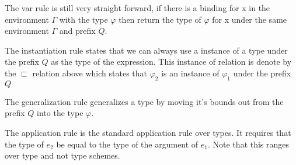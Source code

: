 \begin{prooftree}
\end{prooftree}

The var rule is still very straight forward, if there is a binding for x in the environment $\Gamma$ with the type $\varphi$ then return the type of $\varphi$ for x under the same environment $\Gamma$ and prefix $Q$.

\begin{prooftree}
\end{prooftree}

The instantiation rule states that we can always use a instance of a type under the prefix $Q$ as the type of the expression. This instance of relation is denote by the $\sqsubset$ relation above which states that $\varphi_2$ is an instance of $\varphi_1$ under the prefix $Q$

\begin{prooftree}
\end{prooftree}

The generalization rule generalizes a type by moving it's bounds out from the prefix $Q$ into the type $\varphi$.

\begin{prooftree}
\end{prooftree}

The application rule is the standard application rule over types. It requires that the type of $e_2$ be equal to the type of the argument of $e_1$. Note that this ranges over type and not type schemes.

\begin{prooftree}
\end{prooftree}


